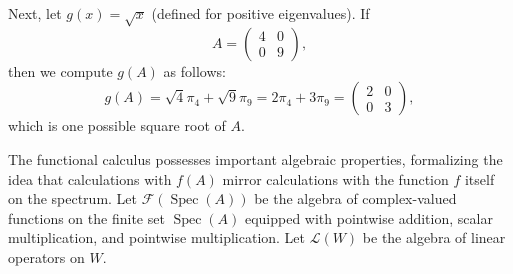 \begin{example}
\begin{itemize}
    Next, let $g(x) = \sqrt{x}$ (defined for positive eigenvalues). If 
    \[
    A = \begin{pmatrix} 4 & 0 \\ 0 & 9 \end{pmatrix},
    \]
    then we compute $g(A)$ as follows:
    \[
    g(A) = \sqrt{4}\pi_4 + \sqrt{9}\pi_9 = 2\pi_4 + 3\pi_9 = \begin{pmatrix} 2 & 0 \\ 0 & 3 \end{pmatrix},
    \]
    which is one possible square root of $A$.
\end{itemize}
\end{example}

The functional calculus possesses important algebraic properties, formalizing the idea that calculations with $f(A)$ mirror calculations with the function $f$ itself on the spectrum. Let $\mathcal{F}(\operatorname{Spec}(A))$ be the algebra of complex-valued functions on the finite set $\operatorname{Spec}(A)$ equipped with pointwise addition, scalar multiplication, and pointwise multiplication. Let $\mathcal{L}(W)$ be the algebra of linear operators on $W$.

